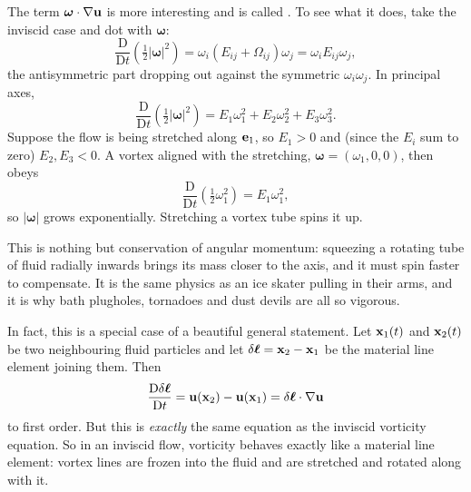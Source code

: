 \documentclass[a4paper]{scrartcl}
\newcommand{\D}{\mathrm{D}}
\newcommand{\Dt}[1]{\frac{\D #1}{\D t}}
\newcommand{\bom}{\boldsymbol{\omega}}
\newcommand{\bell}{\boldsymbol{\ell}}
\begin{document}
The term $\bom \cdot \nabla \vv u$ is more interesting and is called . To see what it does, take the inviscid case and dot with $\bom$:
$$
\Dt{}\left(\tfrac{1}{2}|\bom|^2\right) = \omega_i \left(E_{ij} + \Omega_{ij}\right)\omega_j = \omega_i E_{ij}\omega_j,
$$
the antisymmetric part dropping out against the symmetric $\omega_i \omega_j$. In principal axes,
$$
\Dt{}\left(\tfrac{1}{2}|\bom|^2\right) = E_1 \omega_1^2 + E_2\omega_2^2 + E_3\omega_3^2.
$$
Suppose the flow is being stretched along $\mathbf{e}_1$, so $E_1 > 0$ and (since the $E_i$ sum to zero) $E_2, E_3 < 0$. A vortex aligned with the stretching, $\bom = (\omega_1, 0, 0)$, then obeys
$$
\Dt{}\left(\tfrac{1}{2}\omega_1^2\right) = E_1 \omega_1^2,
$$
so $|\bom|$ grows exponentially. Stretching a vortex tube spins it up.

\begin{center}
\end{center}

This is nothing but conservation of angular momentum: squeezing a rotating tube of fluid radially inwards brings its mass closer to the axis, and it must spin faster to compensate. It is the same physics as an ice skater pulling in their arms, and it is why bath plugholes, tornadoes and dust devils are all so vigorous.

In fact, this is a special case of a beautiful general statement. Let $\mathbf{x}_1(t)$ and $\mathbf{x}_2(t)$ be two neighbouring fluid particles and let $\delta\bell = \vv x_2 - \vv x_1$ be the material line element joining them. Then
$$
\Dt{\delta \bell} = \vv u(\vv x_2) - \vv u(\vv x_1) = \delta\bell \cdot \nabla \vv u
$$
to first order. But this is \emph{exactly} the same equation as the inviscid vorticity equation. So in an inviscid flow, vorticity behaves exactly like a material line element: vortex lines are frozen into the fluid and are stretched and rotated along with it.
\end{document}

